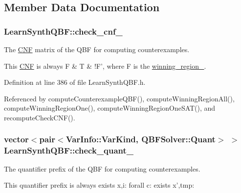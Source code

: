 \subsection{Member Data Documentation}
\hypertarget{classLearnSynthQBF_afe20b32b1b8c07a237322825c91a36f0}{
\subsubsection[{check\-\_\-cnf\-\_\-}]{ Learn\-Synth\-Q\-B\-F\-::check\-\_\-cnf\-\_\-\hspace{0.3cm}{\ttfamily [protected]}}}\label{classLearnSynthQBF_afe20b32b1b8c07a237322825c91a36f0}


The \hyperlink{classCNF}{C\-N\-F} matrix of the Q\-B\-F for computing counterexamples. 

This \hyperlink{classCNF}{C\-N\-F} is always F \& T \& !\-F', where F is the \hyperlink{classLearnSynthQBF_a9c6b41f7df5f4ed4bfc5930136fc1152}{winning\-\_\-region\-\_\-}. 

Definition at line 386 of file Learn\-Synth\-Q\-B\-F.\-h.



Referenced by compute\-Counterexample\-Q\-B\-F(), compute\-Winning\-Region\-All(), compute\-Winning\-Region\-One(), compute\-Winning\-Region\-One\-S\-A\-T(), and recompute\-Check\-C\-N\-F().

\hypertarget{classLearnSynthQBF_afafe15fef745bb97ac36741cbe00d4c1}{
\subsubsection[{check\-\_\-quant\-\_\-}]{\setlength{\rightskip}{0pt plus 5cm}vector$<$pair$<${\bf Var\-Info\-::\-Var\-Kind}, {\bf Q\-B\-F\-Solver\-::\-Quant}$>$ $>$ Learn\-Synth\-Q\-B\-F\-::check\-\_\-quant\-\_\-\hspace{0.3cm}{\ttfamily [protected]}}}\label{classLearnSynthQBF_afafe15fef745bb97ac36741cbe00d4c1}


The quantifier prefix of the Q\-B\-F for computing counterexamples. 

This quantifier prefix is always exists x,i\-: forall c\-: exists x',tmp\-: 


